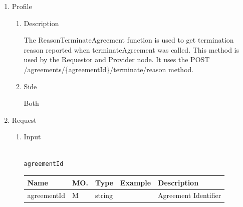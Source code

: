 
\begin{enumerate}

\item Profile

\begin{enumerate}

\item Description

The ReasonTerminateAgreement function is used to get termination reason reported when terminateAgreement was called. 
This method is used by the Requestor and Provider node. It uses the POST /agreements/\{agreementId\}/terminate/reason method.

\item Side

Both

\end{enumerate}

\item Request

\begin{enumerate}

\item Input

\begin{tcolorbox}[boxrule=0pt, frame empty]
\begin{verbatim}

agreementId

\end{verbatim}
\end{tcolorbox}

%

\begin{table}[H]
\footnotesize

\begin{center}
\begin{tabular}{|p{3cm}|l|p{3cm}|p{3cm}|p{4cm}|} 
\hline
\rowcolor{lightgray}	Name	& MO.	& Type	& Example & 	Description \\
\hline
agreementId		& M & 	string				&		& 	Agreement Identifier \\
\hline
\end{tabular}
\end{center}


\end{table}
\end{enumerate}
\end{enumerate}
